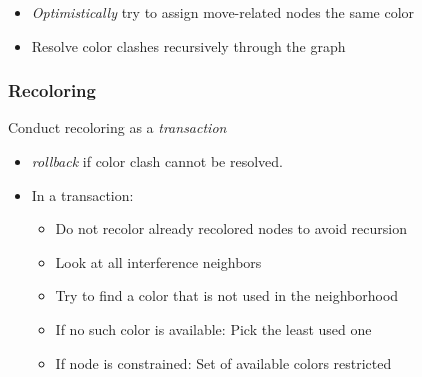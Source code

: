 \begin{frame}[label=current]
\begin{center}
              \end{center}
	\begin{itemize}
		\item \emph{Optimistically} try to assign move-related nodes the same color
		\item Resolve color clashes recursively through the graph
	\end{itemize}

\end{frame}

\begin{frame}[label=current]
	\frametitle{Recoloring}
\begin{block}{}
Conduct recoloring as a \emph{transaction}
\end{block}
	\begin{itemize}
	\item \emph{rollback} if color clash cannot be resolved.
	\item In a transaction:
          \begin{itemize}
          \item Do not recolor already recolored nodes to avoid recursion
          \item Look at all interference neighbors
          \item Try to find a color that is not used in the neighborhood
          \item If no such color is available: Pick the least used one
          \item If node is constrained: Set of available colors restricted
          \end{itemize}
        \end{itemize}
\end{frame}

